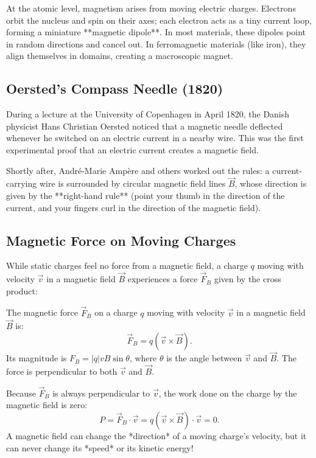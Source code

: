 At the atomic level, magnetism arises from moving electric charges. Electrons orbit the nucleus and spin on their axes; each electron acts as a tiny current loop, forming a miniature **magnetic dipole**. In most materials, these dipoles point in random directions and cancel out. In ferromagnetic materials (like iron), they align themselves in domains, creating a macroscopic magnet.

\subsection{Oersted's Compass Needle (1820)}

During a lecture at the University of Copenhagen in April 1820, the Danish physicist Hans Christian Oersted noticed that a magnetic needle deflected whenever he switched on an electric current in a nearby wire. This was the first experimental proof that an electric current creates a magnetic field. 

Shortly after, André-Marie Ampère and others worked out the rules: a current-carrying wire is surrounded by circular magnetic field lines $\vec{B}$, whose direction is given by the **right-hand rule** (point your thumb in the direction of the current, and your fingers curl in the direction of the magnetic field).

\subsection{Magnetic Force on Moving Charges}

While static charges feel no force from a magnetic field, a charge $q$ moving with velocity $\vec{v}$ in a magnetic field $\vec{B}$ experiences a force $\vec{F}_B$ given by the cross product:
\begin{keybox}
The magnetic force $\vec{F}_B$ on a charge $q$ moving with velocity $\vec{v}$ in a magnetic field $\vec{B}$ is:
\begin{equation}
    \vec{F}_B = q(\vec{v} \times \vec{B}).
\end{equation}
Its magnitude is $F_B = |q| v B \sin\theta$, where $\theta$ is the angle between $\vec{v}$ and $\vec{B}$. The force is perpendicular to both $\vec{v}$ and $\vec{B}$.
\end{keybox}

Because $\vec{F}_B$ is always perpendicular to $\vec{v}$, the work done on the charge by the magnetic field is zero:
\begin{equation}
    P = \vec{F}_B \cdot \vec{v} = q(\vec{v} \times \vec{B}) \cdot \vec{v} = 0.
\end{equation}
A magnetic field can change the *direction* of a moving charge's velocity, but it can never change its *speed* or its kinetic energy!

